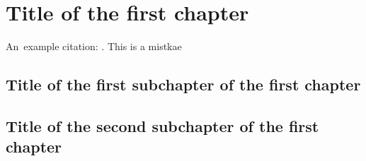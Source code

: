\chapter{Title of the first chapter}

An~example citation: \cite{Andel07}. This is a mistkae

\section{Title of the first subchapter of the first chapter}

\section{Title of the second subchapter of the first chapter}
